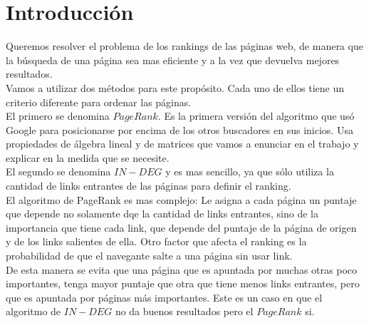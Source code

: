 \section{Introducción}

Queremos resolver el problema de los rankings de las páginas web, de manera que la búsqueda de una página sea mas eficiente y a la vez que devuelva mejores resultados. \\

Vamos a utilizar dos métodos para este propósito. Cada uno de ellos tiene un criterio diferente para ordenar las páginas. \\

El primero se denomina $PageRank$. Es la primera versión del algoritmo que usó Google para posicionarse por encima de los otros buscadores en sus inicios. Usa propiedades de álgebra lineal y de matrices que vamos a enunciar en el trabajo y explicar en la medida que se necesite.\\

El segundo se denomina $IN-DEG$ y es mas sencillo, ya que sólo utiliza la cantidad de links entrantes de las páginas para definir el ranking.\\

El algoritmo de PageRank es mas complejo: Le asigna a cada página un puntaje que depende no solamente dqe la cantidad de links entrantes, sino de la importancia que tiene cada link, que depende del puntaje de la página de origen y de los links salientes de ella. Otro factor que afecta el ranking es la probabilidad de que el navegante salte a una página sin usar link. \\

De esta manera se evita que una página que es apuntada por muchas otras poco importantes, tenga mayor puntaje que otra que tiene menos links entrantes, pero que es apuntada por páginas más importantes. Este es un caso en que el algoritmo de $IN-DEG$ no da buenos resultados pero el $PageRank$ si.


